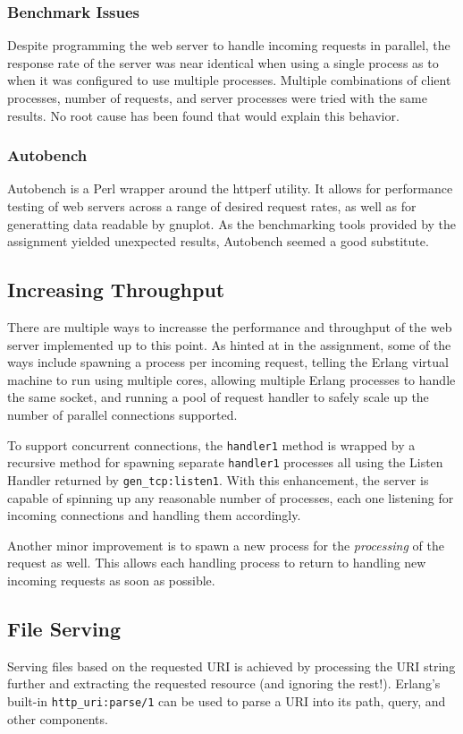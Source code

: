 \documentclass[a4paper, 11pt]{article}
\begin{document}
\subsubsection{Benchmark Issues}
Despite programming the web server to handle incoming requests in parallel, the response rate of the server was near identical when using a single process as to when it was configured to use multiple processes. Multiple combinations of client processes, number of requests, and server processes were tried with the same results. No root cause has been found that would explain this behavior.

\subsubsection{Autobench}
Autobench is a Perl wrapper around the httperf utility. It allows for performance testing of web servers across a range of desired request rates, as well as for generatting data readable by gnuplot. As the benchmarking tools provided by the assignment yielded unexpected results, Autobench seemed a good substitute.

\subsection{Increasing Throughput}
There are multiple ways to increasse the performance and throughput of the web server implemented up to this point. As hinted at in the assignment, some of the ways include spawning a process per incoming request, telling the Erlang virtual machine to run using multiple cores, allowing multiple Erlang processes to handle the same socket, and running a pool of request handler to safely scale up the number of parallel connections supported.

To support concurrent connections, the \texttt{handler\/1} method is wrapped by a recursive method for spawning separate \texttt{handler\/1} processes all using the Listen Handler returned by \texttt{gen\_tcp:listen\/1}. With this enhancement, the server is capable of spinning up any reasonable number of processes, each one listening for incoming connections and handling them accordingly.

Another minor improvement is to spawn a new process for the \textit{processing} of the request as well. This allows each handling process to return to handling new incoming requests as soon as possible.

\subsection{File Serving}
Serving files based on the requested URI is achieved by processing the URI string further and extracting the requested resource (and ignoring the rest!). Erlang's built-in \texttt{http\_uri:parse/1} can be used to parse a URI into its path, query, and other components.
\end{document}
